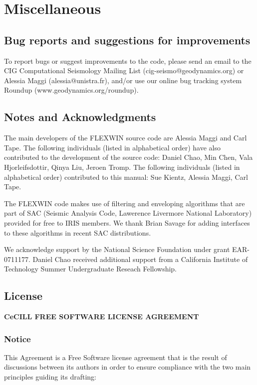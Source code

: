 \chapter{Miscellaneous}

\section{Bug reports and suggestions for improvements}
To report bugs or suggest improvements to the code, please send an email to the CIG Computational Seismology Mailing List (cig-seismo@geodynamics.org) or Alessia Maggi (alessia@unistra.fr), and/or use our online bug tracking system Roundup (www.geodynamics.org/roundup).

\section{Notes and Acknowledgments}
The main developers of the FLEXWIN source code are Alessia Maggi and Carl Tape.  The following individuals (listed in alphabetical order) have also contributed to the development of the source code: Daniel Chao, Min Chen, Vala Hjorleifsdottir, Qinya Liu, Jeroen Tromp.  The following individuals (listed in alphabetical order) contributed to this manual: Sue Kientz, Alessia Maggi, Carl Tape.

The FLEXWIN code makes use of filtering and enveloping algorithms that are part of SAC (Seismic Analysis Code, Lawerence Livermore National Laboratory) provided for free to IRIS members.  We thank Brian Savage for adding interfaces to these algorithms in recent SAC distributions. 

We acknowledge support by the National Science Foundation under grant EAR-0711177.
Daniel Chao received additional support from a California Institute of Technology Summer Undergraduate Reseach Fellowship.


\section{License}
\singlespacing
\setlength\parskip{8pt}

{\center \Large \bf CeCILL FREE SOFTWARE LICENSE AGREEMENT}

\subsection*{Notice}

This Agreement is a Free Software license agreement that is the result of discussions between its authors in order to ensure compliance with the two main principles guiding its drafting:

